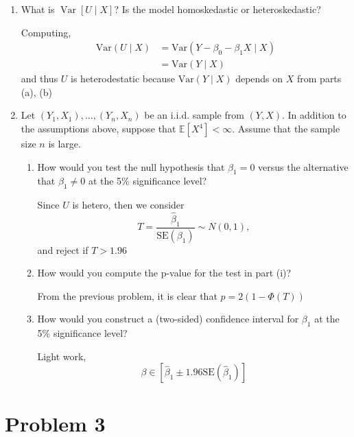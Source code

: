 \documentclass[11pt]{article}
\newcommand{\Var}{\text{Var}}
\begin{document}
\begin{enumerate}[label=(\alph*)]
\begin{solution}
    \end{solution}
    \item What is \( \operatorname{Var}[U \mid X] \)? Is the model homoskedastic or heteroskedastic?
    \begin{solution}
        Computing, 
        \begin{align*}
            \Var(U \mid X) &= \Var(Y - \beta_0 - \beta_1X \mid X)\\
            &=\Var(Y \mid X)
        \end{align*}
        and thus $U$ is heterodestatic because $\Var(Y \mid X)$ depends on $X$ from parts (a), (b)
    \end{solution}
    \item Let \( (Y_1, X_1), \dots, (Y_n, X_n) \) be an i.i.d. sample from \( (Y, X) \). In addition to the assumptions above, suppose that \( \mathbb{E}[X^4] < \infty \). Assume that the sample size \( n \) is large.
    \begin{enumerate}[label=(\roman*)]
        \item How would you test the null hypothesis that \( \beta_1 = 0 \) versus the alternative that \( \beta_1 \neq 0 \) at the 5\% significance level?
        \begin{solution}
            Since $U$ is hetero, 
            then we consider 
            \[T = \frac{\hat\beta_1}{\text{SE}(\beta_1)} \sim N(0,1),\] and reject if $T > 1.96$
        \end{solution}
        \item How would you compute the p-value for the test in part (i)?
        \begin{solution}
            From the previous problem, it is clear that $p = 2(1-\Phi(T))$
        \end{solution}
        \item How would you construct a (two-sided) confidence interval for \( \beta_1 \) at the 5\% significance level?
        \begin{solution}
            Light work, 
            \[\beta \in [\hat{\beta}_1 \pm 1.96\text{SE}(\hat\beta_1)]\]
        \end{solution}
    \end{enumerate}
\end{enumerate}

\newpage
\section*{Problem 3 \heart}
\end{document}
